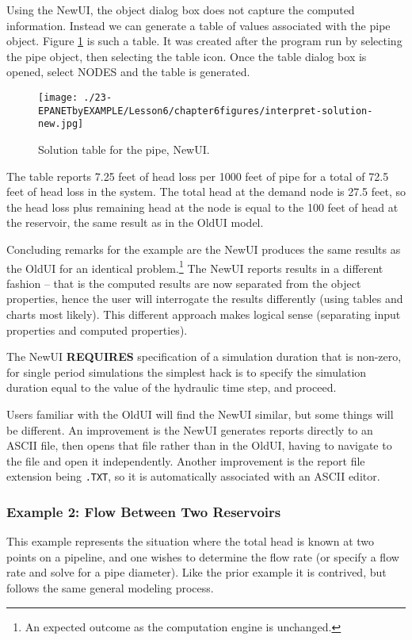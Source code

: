 Using the NewUI, the object dialog box does not capture the computed information.  
Instead we can generate a table of values associated with the pipe object.
Figure \ref{fig:interpret-solution-new} is such a table.
It was created after the program run by selecting the pipe object, then selecting the table icon.
Once the table dialog box is opened, select NODES and the table is generated.

\begin{figure}[h!] %
   \centering
   \texttt{[image: ./23-EPANETbyEXAMPLE/Lesson6/chapter6figures/interpret-solution-new.jpg]} 
   \caption{Solution table for the pipe, NewUI.}
   \label{fig:interpret-solution-new}
\end{figure}

The table reports 7.25 feet of head loss per 1000 feet of pipe for a total of 72.5 feet of head loss in the system.   The total head at the demand node is 27.5 feet, so the head loss plus remaining head at the node is equal to the 100 feet of head at the reservoir, the same result as in the OldUI model.

Concluding remarks for the example are the NewUI produces the same results as the OldUI for an identical problem.\footnote{An expected outcome as the computation engine is unchanged.}
The NewUI reports results in a different fashion -- that is the computed results are now separated from the object properties, hence the user will interrogate the results differently (using tables and charts most likely).  
This different approach makes logical sense (separating input properties and computed properties).

The NewUI \textbf{REQUIRES} specification of a simulation duration that is non-zero, for single period simulations the simplest hack is to specify the simulation duration equal to the value of the hydraulic time step, and proceed.

Users familiar with the OldUI will find the NewUI similar, but some things will be different.
An improvement is the NewUI generates reports directly to an ASCII file, then opens that file rather than in the OldUI, having to navigate to the file and open it independently.   
Another improvement is the report file extension being \texttt{.TXT}, so it is automatically associated with an ASCII editor.
 

\clearpage
\subsubsection{Example 2: Flow Between Two Reservoirs}
This example represents the situation where the total head is known at two points on a pipeline, and one wishes to determine the flow rate (or specify a flow rate and solve for a pipe diameter).   Like the prior example it is contrived, but follows the same general modeling process.

